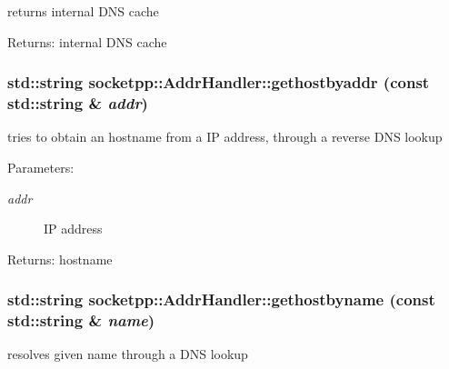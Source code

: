 returns internal DNS cache 

\begin{Desc}
\item[Returns:]internal DNS cache \end{Desc}
\hypertarget{classsocketpp_1_1AddrHandler_2e9b9e6dc7ea4fc4a3500665b3f4062d}{
\subsubsection[{gethostbyaddr}]{\setlength{\rightskip}{0pt plus 5cm}std::string socketpp::AddrHandler::gethostbyaddr (const std::string \& {\em addr})}}
\label{classsocketpp_1_1AddrHandler_2e9b9e6dc7ea4fc4a3500665b3f4062d}


tries to obtain an hostname from a IP address, through a reverse DNS lookup 

\begin{Desc}
\item[Parameters:]
\begin{description}
\item[{\em addr}]IP address \end{description}
\end{Desc}
\begin{Desc}
\item[Returns:]hostname \end{Desc}
\hypertarget{classsocketpp_1_1AddrHandler_19aebc1e9779dee4e5f06d7b39e18959}{
\subsubsection[{gethostbyname}]{\setlength{\rightskip}{0pt plus 5cm}std::string socketpp::AddrHandler::gethostbyname (const std::string \& {\em name})}}
\label{classsocketpp_1_1AddrHandler_19aebc1e9779dee4e5f06d7b39e18959}


resolves given name through a DNS lookup 

